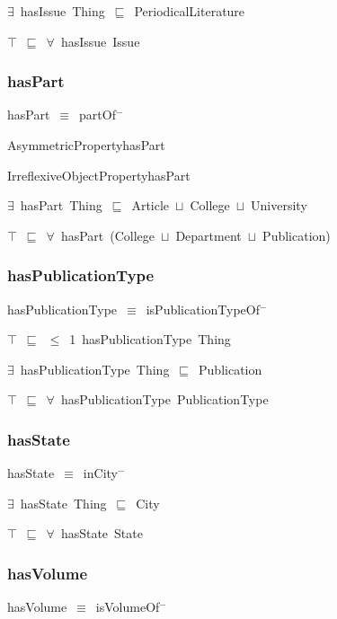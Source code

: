 \documentclass{article}
\begin{document}
\ensuremath{\exists}~hasIssue~Thing~\ensuremath{\sqsubseteq}~PeriodicalLiterature

\ensuremath{\top}~\ensuremath{\sqsubseteq}~\ensuremath{\forall}~hasIssue~Issue

\subsubsection*{hasPart}

hasPart~\ensuremath{\equiv}~partOf\ensuremath{^-}

AsymmetricPropertyhasPart

IrreflexiveObjectPropertyhasPart

\ensuremath{\exists}~hasPart~Thing~\ensuremath{\sqsubseteq}~Article~\ensuremath{\sqcup}~College~\ensuremath{\sqcup}~University

\ensuremath{\top}~\ensuremath{\sqsubseteq}~\ensuremath{\forall}~hasPart~(College~\ensuremath{\sqcup}~Department~\ensuremath{\sqcup}~Publication)

\subsubsection*{hasPublicationType}

hasPublicationType~\ensuremath{\equiv}~isPublicationTypeOf\ensuremath{^-}

\ensuremath{\top}~\ensuremath{\sqsubseteq}~\ensuremath{\leq}~1~hasPublicationType~Thing

\ensuremath{\exists}~hasPublicationType~Thing~\ensuremath{\sqsubseteq}~Publication

\ensuremath{\top}~\ensuremath{\sqsubseteq}~\ensuremath{\forall}~hasPublicationType~PublicationType

\subsubsection*{hasState}

hasState~\ensuremath{\equiv}~inCity\ensuremath{^-}

\ensuremath{\exists}~hasState~Thing~\ensuremath{\sqsubseteq}~City

\ensuremath{\top}~\ensuremath{\sqsubseteq}~\ensuremath{\forall}~hasState~State

\subsubsection*{hasVolume}

hasVolume~\ensuremath{\equiv}~isVolumeOf\ensuremath{^-}
\end{document}
